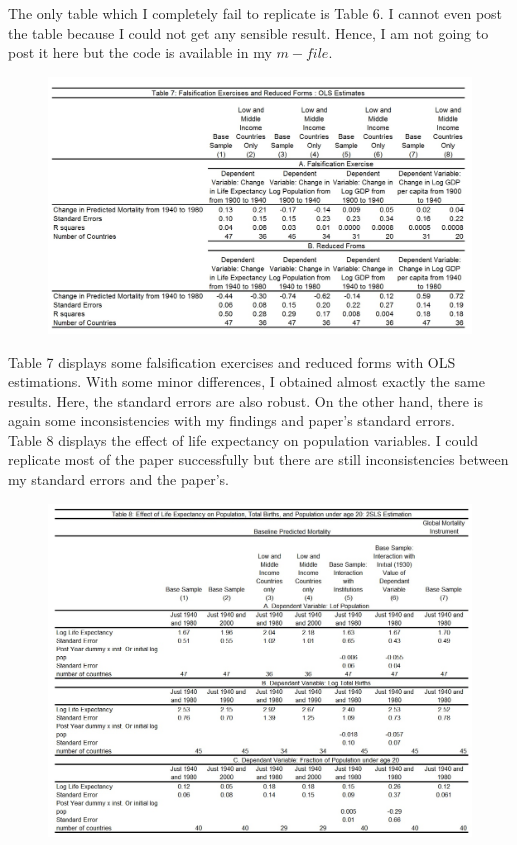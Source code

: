 \documentclass[11pt]{article}
\begin{document}
The only table which I completely fail to replicate is Table 6. I cannot even post the table because I could not get any sensible result. Hence, I am not going to post it here but the code is available in my $m-file$. 
\begin{figure} [H]
\centering
\includegraphics[width=\textwidth]{table7}
\label{table7}
\end{figure}
Table 7 displays some falsification exercises and reduced forms with OLS estimations. With some minor differences, I obtained almost exactly the same results. Here, the standard errors are also robust. On the other hand, there is again some inconsistencies with my findings and paper's standard errors. 
\\
Table 8 displays the effect of life expectancy on population variables. I could replicate most of the paper successfully but there are still inconsistencies between my standard errors and the paper's.
\begin{figure} [H]
\centering
\includegraphics[width=\textwidth]{table8}
\label{table8}
\end{figure}
\end{document}

